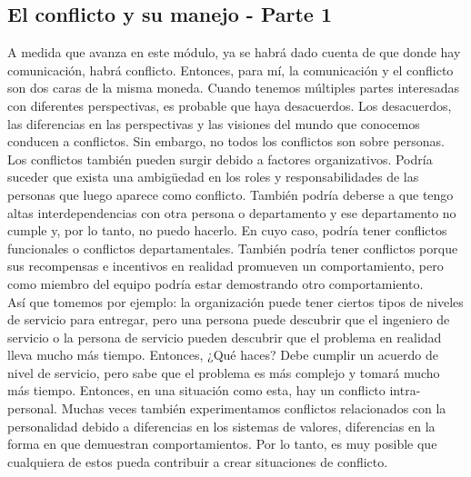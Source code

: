 \documentclass[10pt]{book}
\begin{document}
\subsection{El conflicto y su manejo - Parte 1}
A medida que avanza en este módulo, ya se habrá dado cuenta de que donde hay comunicación, habrá conflicto. Entonces, para mí, la comunicación y el conflicto son dos caras de la misma moneda. Cuando tenemos múltiples partes interesadas con diferentes perspectivas, es probable que haya desacuerdos. Los desacuerdos, las diferencias en las perspectivas y las visiones del mundo que conocemos conducen a conflictos. Sin embargo, no todos los conflictos son sobre personas.\\
Los conflictos también pueden surgir debido a factores organizativos. Podría suceder que exista una ambigüedad en los roles y responsabilidades de las personas que luego aparece como conflicto. También podría deberse a que tengo altas interdependencias con otra persona o departamento y ese departamento no cumple y, por lo tanto, no puedo hacerlo. En cuyo caso, podría tener conflictos funcionales o conflictos departamentales. También podría tener conflictos porque sus recompensas e incentivos en realidad promueven un comportamiento, pero como miembro del equipo podría estar demostrando otro comportamiento.\\
Así que tomemos por ejemplo: la organización puede tener ciertos tipos de niveles de servicio para entregar, pero una persona puede descubrir que el ingeniero de servicio o la persona de servicio pueden descubrir que el problema en realidad lleva mucho más tiempo. Entonces, ¿Qué haces? Debe cumplir un acuerdo de nivel de servicio, pero sabe que el problema es más complejo y tomará mucho más tiempo. Entonces, en una situación como esta, hay un conflicto intra-personal. Muchas veces también experimentamos conflictos relacionados con la personalidad debido a diferencias en los sistemas de valores, diferencias en la forma en que demuestran comportamientos. Por lo tanto, es muy posible que cualquiera de estos pueda contribuir a crear situaciones de conflicto.     
\end{document}
